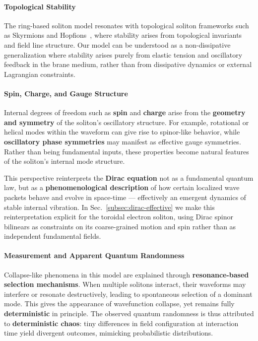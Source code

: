\paragraph{Topological Stability}\label{topological-stability}

The ring-based soliton model resonates with topological soliton frameworks such as
Skyrmions and Hopfions~\cite{Sugic2021,HopfSolitonVideo}, where stability arises from topological invariants and
field line structure. Our model can be understood as a non-dissipative generalization
where stability arises purely from elastic tension and oscillatory feedback in the
brane medium, rather than from dissipative dynamics or external Lagrangian constraints.

\paragraph{Spin, Charge, and Gauge
Structure}\label{spin-charge-and-gauge-structure}

Internal degrees of freedom such as \textbf{spin} and \textbf{charge}
arise from the \textbf{geometry and symmetry} of the soliton's
oscillatory structure. For example, rotational or helical modes within
the waveform can give rise to spinor-like behavior, while
\textbf{oscillatory phase symmetries} may manifest as effective gauge
symmetries. Rather than being fundamental inputs, these properties
become natural features of the soliton's internal mode structure.

This perspective reinterprets the \textbf{Dirac equation} not as a
fundamental quantum law, but as a \textbf{phenomenological description}
of how certain localized wave packets behave and evolve in space-time
--- effectively an emergent dynamics of stable internal vibration. In
Sec.~\ref{subsec:dirac-effective} we make this reinterpretation
explicit for the toroidal electron soliton, using Dirac spinor
bilinears as constraints on its coarse-grained motion and spin rather
than as independent fundamental fields.

\paragraph{Measurement and Apparent Quantum
Randomness}\label{measurement-and-apparent-quantum-randomness}

Collapse-like phenomena in this model are explained through
\textbf{resonance-based selection mechanisms}. When multiple solitons
interact, their waveforms may interfere or resonate destructively,
leading to spontaneous selection of a dominant mode. This gives the
appearance of wavefunction collapse, yet remains fully
\textbf{deterministic} in principle. The observed quantum randomness is
thus attributed to \textbf{deterministic chaos}: tiny differences in
field configuration at interaction time yield divergent outcomes,
mimicking probabilistic distributions.

